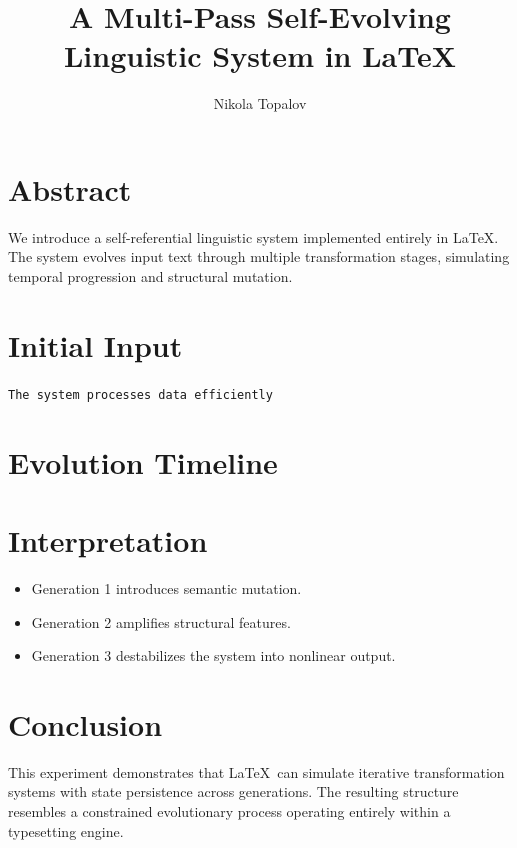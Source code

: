 \documentclass[12pt]{article}
\title{A Multi-Pass Self-Evolving Linguistic System in \LaTeX}
\author{Nikola Topalov}
\date{}
\begin{document}
\maketitle

\section*{Abstract}
We introduce a self-referential linguistic system implemented entirely in \LaTeX. The system evolves input text through multiple transformation stages, simulating temporal progression and structural mutation.

\section*{Initial Input}
\texttt{The system processes data efficiently}

\section*{Evolution Timeline}


\section*{Interpretation}
\begin{itemize}
\item Generation 1 introduces semantic mutation.
\item Generation 2 amplifies structural features.
\item Generation 3 destabilizes the system into nonlinear output.
\end{itemize}

\section*{Conclusion}
This experiment demonstrates that \LaTeX\ can simulate iterative transformation systems with state persistence across generations. The resulting structure resembles a constrained evolutionary process operating entirely within a typesetting engine.
\end{document}
